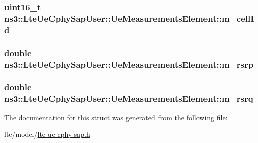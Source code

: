 \subsubsection[{\texorpdfstring{m\+\_\+cell\+Id}{m_cellId}}]{\setlength{\rightskip}{0pt plus 5cm}uint16\+\_\+t ns3\+::\+Lte\+Ue\+Cphy\+Sap\+User\+::\+Ue\+Measurements\+Element\+::m\+\_\+cell\+Id}\hypertarget{structns3_1_1LteUeCphySapUser_1_1UeMeasurementsElement_a000f7f7b650c077e864a55492ea5c868}{}\label{structns3_1_1LteUeCphySapUser_1_1UeMeasurementsElement_a000f7f7b650c077e864a55492ea5c868}
\subsubsection[{\texorpdfstring{m\+\_\+rsrp}{m_rsrp}}]{\setlength{\rightskip}{0pt plus 5cm}double ns3\+::\+Lte\+Ue\+Cphy\+Sap\+User\+::\+Ue\+Measurements\+Element\+::m\+\_\+rsrp}\hypertarget{structns3_1_1LteUeCphySapUser_1_1UeMeasurementsElement_a1750d8c8076a1c90e1a18367b0d0b4f8}{}\label{structns3_1_1LteUeCphySapUser_1_1UeMeasurementsElement_a1750d8c8076a1c90e1a18367b0d0b4f8}
\subsubsection[{\texorpdfstring{m\+\_\+rsrq}{m_rsrq}}]{\setlength{\rightskip}{0pt plus 5cm}double ns3\+::\+Lte\+Ue\+Cphy\+Sap\+User\+::\+Ue\+Measurements\+Element\+::m\+\_\+rsrq}\hypertarget{structns3_1_1LteUeCphySapUser_1_1UeMeasurementsElement_a2c5e116cfae9e38ed2795ece4f94d38c}{}\label{structns3_1_1LteUeCphySapUser_1_1UeMeasurementsElement_a2c5e116cfae9e38ed2795ece4f94d38c}


The documentation for this struct was generated from the following file\+:\begin{DoxyCompactItemize}
\item 
lte/model/\hyperlink{lte-ue-cphy-sap_8h}{lte-\/ue-\/cphy-\/sap.\+h}\end{DoxyCompactItemize}
